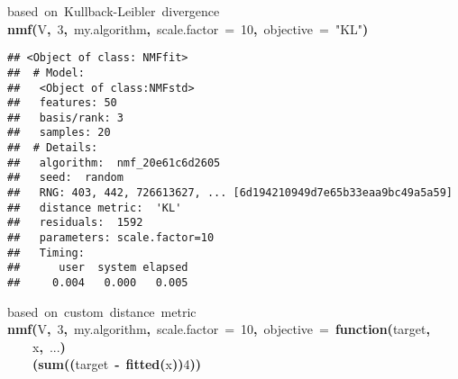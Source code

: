 \documentclass[a4paper]{article}\usepackage{graphicx, color}
\makeatletter
\newcommand{\hlnumber}[1]{\textcolor[rgb]{0,0,0}{#1}}%
\newcommand{\hlfunctioncall}[1]{\textcolor[rgb]{0.501960784313725,0,0.329411764705882}{\textbf{#1}}}%
\newcommand{\hlstring}[1]{\textcolor[rgb]{0.6,0.6,1}{#1}}%
\newcommand{\hlkeyword}[1]{\textcolor[rgb]{0,0,0}{\textbf{#1}}}%
\newcommand{\hlargument}[1]{\textcolor[rgb]{0.690196078431373,0.250980392156863,0.0196078431372549}{#1}}%
\newcommand{\hlcomment}[1]{\textcolor[rgb]{0.180392156862745,0.6,0.341176470588235}{#1}}%
\newcommand{\hlformalargs}[1]{\textcolor[rgb]{0.690196078431373,0.250980392156863,0.0196078431372549}{#1}}%
\newcommand{\hlsymbol}[1]{\textcolor[rgb]{0,0,0}{#1}}%
\newcommand{\hlstd}[1]{\textcolor[rgb]{0,0,0}{#1}}%
\newenvironment{kframe}{%
 \def\FrameCommand##1{\hskip\@totalleftmargin \hskip-\fboxsep
 \colorbox{shadecolor}{##1}\hskip-\fboxsep
     \hskip-\linewidth \hskip-\@totalleftmargin \hskip\columnwidth}%
 \MakeFramed {\advance\hsize-\width
   \@totalleftmargin\z@ \linewidth\hsize
   \@setminipage}}%
 {\par\unskip\endMakeFramed}
\newenvironment{knitrout}{}{} %
\makeatother
\begin{document}
\begin{knitrout}
\color{fgcolor}\begin{kframe}
\begin{flushleft}
\ttfamily\noindent
\hlcomment{\usebox{\hlnormalsizeboxhash}{\ }based{\ }on{\ }Kullback-Leibler{\ }divergence}\hspace*{\fill}\\
\hlstd{}\hlfunctioncall{nmf}\hlkeyword{(}\hlsymbol{V}\hlkeyword{,}{\ }\hlnumber{3}\hlkeyword{,}{\ }\hlsymbol{my.algorithm}\hlkeyword{,}{\ }\hlargument{scale.factor}{\ }\hlargument{=}{\ }\hlnumber{10}\hlkeyword{,}{\ }\hlargument{objective}{\ }\hlargument{=}{\ }\hlstring{"{}KL"{}}\hlkeyword{)}\mbox{}
\normalfont
\end{flushleft}
\begin{verbatim}
## <Object of class: NMFfit>
##  # Model:
##   <Object of class:NMFstd>
##   features: 50 
##   basis/rank: 3 
##   samples: 20 
##  # Details:
##   algorithm:  nmf_20e61c6d2605 
##   seed:  random 
##   RNG: 403, 442, 726613627, ... [6d194210949d7e65b33eaa9bc49a5a59]
##   distance metric:  'KL' 
##   residuals:  1592 
##   parameters: scale.factor=10 
##   Timing:
##      user  system elapsed 
##     0.004   0.000   0.005 
\end{verbatim}
\begin{flushleft}
\ttfamily\noindent
\hlcomment{\usebox{\hlnormalsizeboxhash}{\ }based{\ }on{\ }custom{\ }distance{\ }metric}\hspace*{\fill}\\
\hlstd{}\hlfunctioncall{nmf}\hlkeyword{(}\hlsymbol{V}\hlkeyword{,}{\ }\hlnumber{3}\hlkeyword{,}{\ }\hlsymbol{my.algorithm}\hlkeyword{,}{\ }\hlargument{scale.factor}{\ }\hlargument{=}{\ }\hlnumber{10}\hlkeyword{,}{\ }\hlargument{objective}{\ }\hlargument{=}{\ }\hlkeyword{function}\hlkeyword{(}\hlformalargs{target}\hlkeyword{,}\hspace*{\fill}\\
\hlstd{}{\ }{\ }{\ }{\ }\hlformalargs{x}\hlkeyword{,}{\ }\hlformalargs{...}\hlkeyword{)}{\ }\hlkeyword{\usebox{\hlnormalsizeboxopenbrace}}\hspace*{\fill}\\
\hlstd{}{\ }{\ }{\ }{\ }\hlkeyword{(}\hlfunctioncall{sum}\hlkeyword{(}\hlkeyword{(}\hlsymbol{target}{\ }\hlkeyword{-}{\ }\hlfunctioncall{fitted}\hlkeyword{(}\hlsymbol{x}\hlkeyword{)}\hlkeyword{)}\hlkeyword{\usebox{\hlnormalsizeboxhat}}\hlnumber{4}\hlkeyword{)}\hlkeyword{)}\hlkeyword{\usebox{\hlnormalsizeboxhat}}\hlkeyword{\usebox{\hlnormalsizeboxopenbrace}}\hspace*{\fill}\\

\end{flushleft}
\end{kframe}
\end{knitrout}
\end{document}
